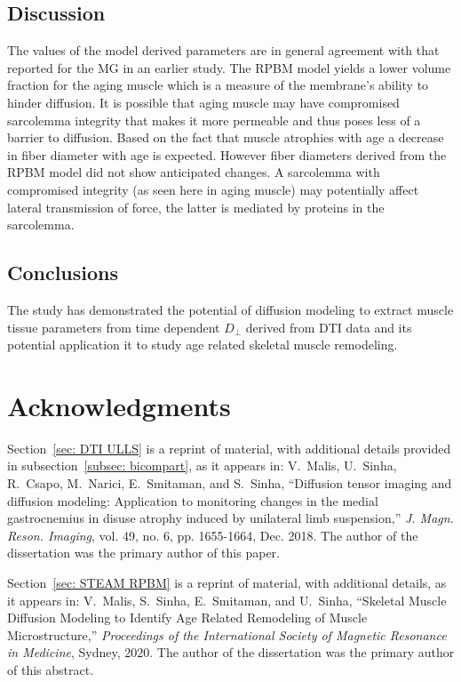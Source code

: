 \subsection{Discussion} 
The values of the model derived parameters are in general agreement with that reported for the MG in an earlier study. 
The RPBM model yields a lower volume fraction for the aging muscle which is a measure of the membrane's ability to hinder diffusion. 
It is possible that aging muscle may have compromised sarcolemma integrity that makes it more permeable and thus poses less of a barrier to diffusion. 
Based on the fact that muscle atrophies with age a decrease in fiber diameter with age is expected. 
However fiber diameters derived from the RPBM model did not show anticipated changes. 
A sarcolemma with compromised integrity (as seen here in aging muscle) may potentially affect lateral transmission of force, the latter is mediated by proteins in the sarcolemma.
\subsection{Conclusions} 
The study has demonstrated the potential of diffusion modeling to extract muscle tissue parameters from time dependent $D_\perp$ derived from DTI data and its potential application it to study age related skeletal muscle remodeling.
\section{Acknowledgments}
Section~\ref{sec: DTI ULLS} is a reprint of material, with additional details provided in subsection~\ref{subsec: bicompart}, as it appears in: V.~Malis, U.~Sinha, R.~Csapo, M.~Narici, E.~Smitaman, and S.~Sinha, ``Diffusion tensor imaging and diffusion modeling: Application to monitoring changes in the medial gastrocnemius in disuse atrophy induced by unilateral limb suspension,'' \emph{J. Magn. Reson. Imaging}, vol. 49, no. 6, pp. 1655-1664, Dec. 2018.
The author of the dissertation was the primary author of this paper.

Section~\ref{sec: STEAM RPBM} is a reprint of material, with additional details, as it appears in: V.~Malis, S.~Sinha, E.~Smitaman, and U.~Sinha, ``Skeletal Muscle Diffusion Modeling to Identify Age Related Remodeling of Muscle Microstructure,'' \emph{Proceedings of the International Society of Magnetic Resonance in Medicine}, Sydney, 2020.
The author of the dissertation was the primary author of this abstract.